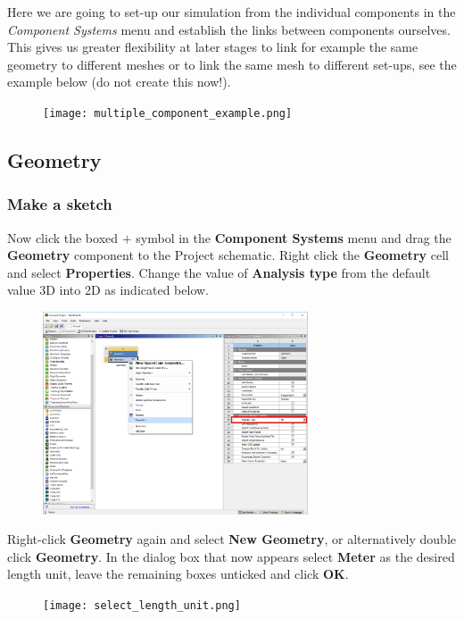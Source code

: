 \documentclass[11pt,a4paper,oneside]{scrartcl}
\newcommand\bfr[1]{\textcolor[rgb]{1,0.00,0.00}{\textbf{\textsf{#1}}}}
\begin{document}
Here we are going to set-up our simulation from the individual components in the \emph{Component Systems} menu and establish the links between components ourselves. This gives us greater flexibility at later stages to link for example the same geometry to different meshes or to link the same mesh to different set-ups, see the example below (do not create this now!).

\begin{figure}[H]
\begin{center}
\texttt{[image: multiple\_component\_example.png]}
\end{center}
\end{figure}

\subsection{Geometry}

\subsubsection{Make a sketch}
Now click the boxed $+$ symbol in the \bfr{Component Systems} menu and drag the \bfr{Geometry} component to the Project schematic. Right click the \bfr{Geometry} cell and select \bfr{Properties}. Change the value of \bfr{Analysis type} from the default value 3D into 2D as indicated below.
\begin{figure}[H]
\begin{center}
\includegraphics[width=0.7\textwidth,clip]{geometry_analysis_type.png}
\end{center}
\end{figure}
Right-click \bfr{Geometry} again and select \bfr{New Geometry}, or alternatively double click \bfr{Geometry}. In the dialog box that now appears select \bfr{Meter} as the desired length unit, leave the remaining boxes unticked and click \bfr{OK}.
\begin{figure}[H]
\begin{center}
\texttt{[image: select\_length\_unit.png]}
\end{center}
\end{figure}
\end{document}
